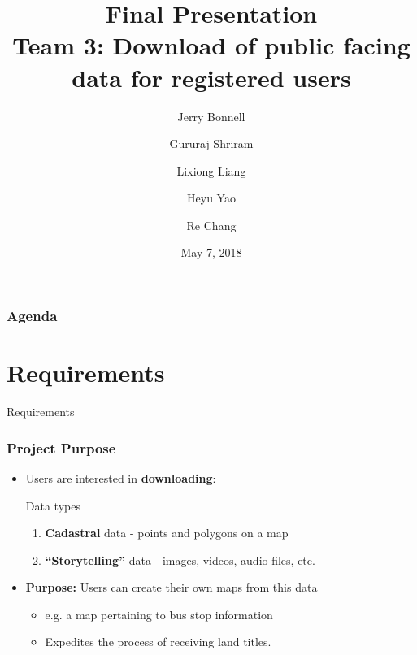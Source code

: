 \documentclass[xcolor=table]{beamer}
\title{
\textbf{Final Presentation} \\ \small{Team 3: Download of public facing data for registered users}
}
\author{
Jerry Bonnell
\and Gururaj Shriram
\and Lixiong Liang
\and Heyu Yao
\and Re Chang 
} %
\date{May 7, 2018} %
\begin{document}
\begin{frame}[plain]
	\titlepage
\end{frame}

\begin{frame}
	\frametitle{Agenda}
	\tableofcontents
\end{frame}

\section{Requirements}
\begin{frame}[plain]
	\Huge{\centerline{Requirements}}
\end{frame}

\begin{frame}
	\frametitle{Project Purpose}
	\begin{itemize}
		\item Users are interested in \textbf{downloading}:
		      \begin{block}{Data types}
			      \begin{enumerate}
					  \item \textbf{Cadastral} data - points and polygons on a map
					  \item \textbf{``Storytelling''} data - images, videos, audio files, etc. %
			      \end{enumerate}
			  \end{block}
        \vspace{4px}
		\item \textbf{Purpose:} Users can create their own maps from this data
			\begin{itemize}
				\item e.g. a map pertaining to bus stop information
				\item Expedites the process of receiving land titles.
			\end{itemize}
	\end{itemize}
\end{frame}
\end{document}
